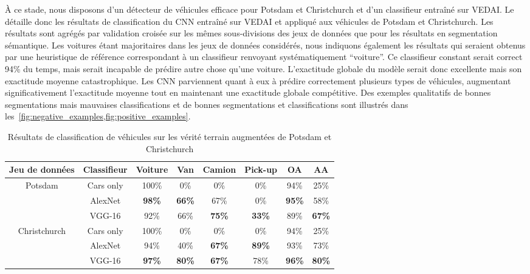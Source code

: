 À ce stade, nous disposons d'un détecteur de véhicules efficace pour Potsdam et Christchurch et d'un classifieur entraîné sur \gls{VEDAI}. Le~ détaille donc les résultats de classification du \gls{CNN} entraîné sur \gls{VEDAI} et appliqué aux véhicules de Potsdam et Christchurch. Les résultats sont agrégés par validation croisée sur les mêmes sous-divisions des jeux de données que pour les résultats en segmentation sémantique. Les voitures étant majoritaires dans les jeux de données considérés, nous indiquons également les résultats qui seraient obtenus par une heuristique de référence correspondant à un classifieur renvoyant systématiquement ``voiture''. Ce classifieur constant serait correct 94\% du temps, mais serait incapable de prédire autre chose qu'une voiture. L'exactitude globale du modèle serait donc excellente mais son exactitude moyenne catastrophique. Les \gls{CNN} parviennent quant à eux à prédire correctement plusieurs types de véhicules, augmentant significativement l'exactitude moyenne tout en maintenant une exactitude globale compétitive. Des exemples qualitatifs de bonnes segmentations mais mauvaises classifications et de bonnes segmentations et classifications sont illustrés dans les~\cref{fig:negative_examples,fig:positive_examples}.

\begin{table}[t]
\centering
  \caption{Résultats de classification de véhicules sur les vérité terrain augmentées de Potsdam et Christchurch}
  \label{table:results_classif}
  \begin{tabular}{cccccccc}
  \toprule
  \textbf{Jeu de données} & \textbf{Classifieur} & \textbf{Voiture} & \textbf{Van} & \textbf{Camion} & \textbf{Pick-up} & \textbf{OA} & \textbf{AA}\\
  \midrule
  \multirow{3}{*}{Potsdam} & Cars only & 100\% & 0\% & 0\% & 0\% & 94\% & 25\%\\
  & AlexNet & \textbf{98\%} & \textbf{66\%} & 67\% & 0\% & \textbf{95\%} & 58\%\\
  & VGG-16 & 92\% & 66\% & \textbf{75\%} & \textbf{33\%} & 89\% & \textbf{67\%}\\
  \midrule
  \multirow{3}{*}{Christchurch} & Cars only & 100\% & 0\% & 0\% & 0\% & 94\% & 25\%\\
  & AlexNet & 94\% & 40\% & \textbf{67\%} & \textbf{89\%} & 93\% & 73\%\\
  & VGG-16 & \textbf{97\%} & \textbf{80\%} & \textbf{67\%} & 78\% & \textbf{96\%} & \textbf{80\%}\\
  \bottomrule
  \end{tabular}
\end{table}

